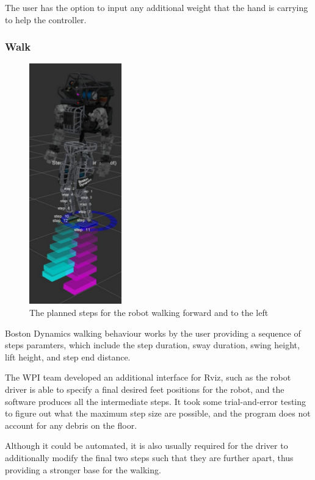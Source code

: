 \documentclass[12pt]{report}
\begin{document}
The user has the option to input any additional weight that the hand is carrying to help the controller.
 
\subsubsection{Walk}

\begin{figure}
  \begin{center}
    \includegraphics[scale=0.5]{images/step_gui.png}
  \end{center}
  \caption{The planned steps for the robot walking forward and to the left}
\end{figure}


Boston Dynamics walking behaviour works by the user providing a sequence of steps paramters, which include the step duration, sway duration, swing height, lift height, and step end distance.  

The WPI team developed an additional interface for Rviz, such as the robot driver is able to specify a final desired feet positions for the robot, and the software produces all the intermediate steps. It took some trial-and-error testing to figure out what the maximum step size are possible, and the program does not account for any debris on the floor. 

Although it could be automated, it is also usually required for the driver to additionally modify the final two steps such that they are further apart, thus providing a stronger base for the walking. 
\end{document}
